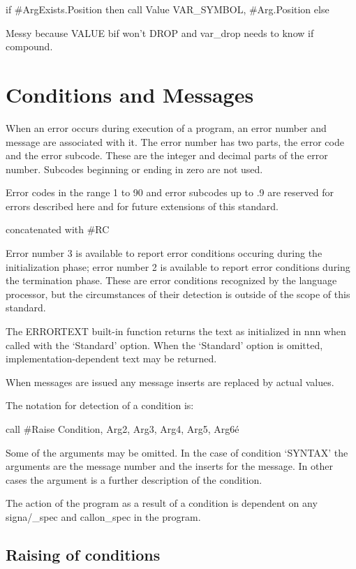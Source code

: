 if \#ArgExists.Position then call Value VAR\_SYMBOL, \#Arg.Position else

Messy because VALUE bif won't DROP and var\_drop needs to know if
compound.

\section{Conditions and Messages}\label{conditions-and-messages}

When an error occurs during execution of a program, an error number and
message are associated with it. The error number has two parts, the
error code and the error subcode. These are the integer and decimal
parts of the error number. Subcodes beginning or ending in zero are not
used.

Error codes in the range 1 to 90 and error subcodes up to .9 are
reserved for errors described here and for future extensions of this
standard.

concatenated with \#RC

Error number 3 is available to report error conditions occuring during
the initialization phase; error number 2 is available to report error
conditions during the termination phase. These are error conditions
recognized by the language processor, but the circumstances of their
detection is outside of the scope of this standard.

The ERRORTEXT built-in function returns the text as initialized in nnn
when called with the `Standard' option. When the `Standard' option is
omitted, implementation-dependent text may be returned.

When messages are issued any message inserts are replaced by actual
values.

The notation for detection of a condition is:

call \#Raise Condition, Arg2, Arg3, Arg4, Arg5, Arg6é

Some of the arguments may be omitted. In the case of condition `SYNTAX'
the arguments are the message number and the inserts for the message. In
other cases the argument is a further description of the condition.

The action of the program as a result of a condition is dependent on any
signa/\_spec and callon\_spec in the program.

\subsection{Raising of conditions}\label{raising-of-conditions}

